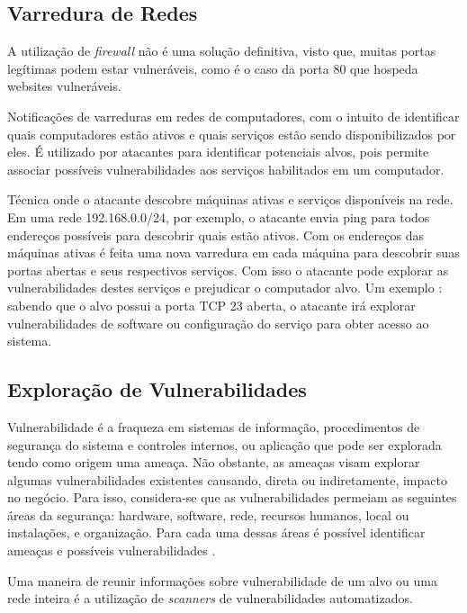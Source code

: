\documentclass[
	12pt,				
	openright,		
	twoside,	
	a4paper,
	english,	
	brazil	
	]{abntex2}
\begin{document}
\subsection{Varredura de Redes} \label{sec:varredura}
A utilização de \textit{firewall} não é uma solução definitiva, visto que, muitas portas legítimas podem estar vulneráveis, como é o caso da porta 80 que hospeda websites vulneráveis.

Notificações de varreduras em redes de computadores, com o intuito de identificar quais computadores estão ativos e quais serviços estão sendo disponibilizados por eles. É utilizado por atacantes para identificar potenciais alvos, pois permite associar possíveis vulnerabilidades aos serviços habilitados em um computador.

Técnica onde o atacante descobre máquinas ativas e serviços disponíveis na rede. Em uma rede 192.168.0.0/24, por exemplo, o atacante envia ping para todos endereços possíveis para descobrir quais estão ativos. Com os endereços das máquinas ativas é feita uma nova varredura em cada máquina para descobrir suas portas abertas e seus respectivos serviços. Com isso o atacante pode explorar as vulnerabilidades destes serviços e prejudicar o computador alvo. Um exemplo : sabendo que o alvo possui a porta TCP 23 aberta, o atacante irá explorar vulnerabilidades de software ou configuração do serviço para obter acesso ao sistema.

\subsection{Exploração de Vulnerabilidades} \label{sec:exploração}


Vulnerabilidade é a fraqueza em sistemas de informação, procedimentos de segurança do sistema e controles internos, ou aplicação que pode ser explorada tendo como origem uma ameaça. Não obstante, as ameaças visam explorar algumas vulnerabilidades existentes causando, direta ou indiretamente, impacto no negócio. Para isso, considera-se que as vulnerabilidades permeiam as seguintes áreas da segurança: hardware, software, rede, recursos humanos, local ou instalações, e organização. Para cada uma dessas áreas é possível identificar ameaças e possíveis vulnerabilidades \cite{pentest-sigaa:rafela}.

Uma maneira de reunir informações sobre vulnerabilidade de um alvo ou uma rede inteira é a utilização de \textit{scanners} de vulnerabilidades automatizados.
\end{document}
